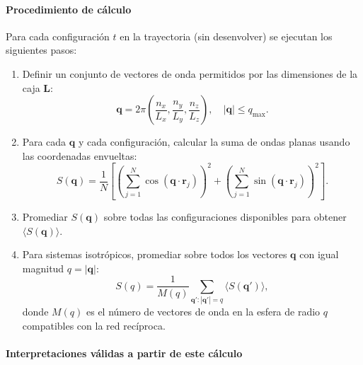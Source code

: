 \documentclass{tufte-handout}
\begin{document}
\paragraph*{Procedimiento de cálculo}

Para cada configuración $t$ en la trayectoria (sin desenvolver) se ejecutan los siguientes pasos:

\begin{enumerate}
    \item Definir un conjunto de vectores de onda permitidos por las dimensiones de la caja $\mathbf{L}$:
    \begin{equation}
        \mathbf{q} = 2\pi\left( \frac{n_x}{L_x}, \frac{n_y}{L_y}, \frac{n_z}{L_z} \right), \quad |\mathbf{q}| \leq q_{\text{max}}.
    \end{equation}
    
    \item Para cada $\mathbf{q}$ y cada configuración, calcular la suma de ondas planas usando las coordenadas envueltas:
    \begin{equation}
        S(\mathbf{q}) = \frac{1}{N} \left[ \left( \sum_{j=1}^N \cos(\mathbf{q}\cdot\mathbf{r}_j) \right)^2 + \left( \sum_{j=1}^N \sin(\mathbf{q}\cdot\mathbf{r}_j) \right)^2 \right].
    \end{equation}
    
    \item Promediar $S(\mathbf{q})$ sobre todas las configuraciones disponibles para obtener $\langle S(\mathbf{q}) \rangle$.
    
    \item Para sistemas isotrópicos, promediar sobre todos los vectores $\mathbf{q}$ con igual magnitud $q = |\mathbf{q}|$:
    \begin{equation}
        S(q) = \frac{1}{M(q)} \sum_{\mathbf{q}' : |\mathbf{q}'|=q} \langle S(\mathbf{q}') \rangle,
    \end{equation}
    donde $M(q)$ es el número de vectores de onda en la esfera de radio $q$ compatibles con la red recíproca.
\end{enumerate}

\paragraph*{Interpretaciones válidas a partir de este cálculo}
\end{document}
